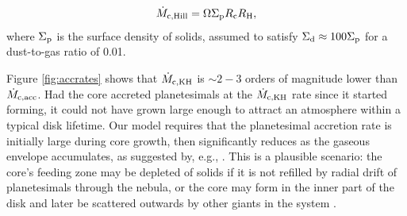 \documentclass[apj]{emulateapj}
\newcommand{\co}{_{\rm c}}
\newcommand{\di}{_{\rm d}}
\begin{document}

\begin{equation}
\label{eq:MdotHill}
\dot{M}_{\rm{c,Hill}}=\Omega \Sigma_{\rm p} R\co R_{\rm H},
\end{equation}
where $\Sigma_{\rm p}$ is the surface density of solids, assumed to satisfy $\Sigma\di \approx 100 \Sigma_{\rm p}$ for a dust-to-gas ratio of 0.01.

Figure \ref{fig:accrates} shows that $\dot{M}_{\rm c,KH}$ is $\sim2-3$ orders of magnitude lower than $\dot{M}_{\rm c, acc}$. Had the core accreted planetesimals at the $\dot{M}_{\rm c, KH}$ rate since it started forming, it could not have grown large enough to attract an atmosphere within a typical disk lifetime. Our model requires that the planetesimal accretion rate is initially large during core growth, then significantly reduces as the gaseous envelope accumulates, as suggested by, e.g., \citet{pollack96}. This is a plausible scenario: the core's feeding zone may be depleted of solids if it is not refilled by radial drift of planetesimals through the nebula, or the core may form in the inner part of the disk and later be scattered outwards by other giants in the system \citep{ida13}. 

\end{document}
